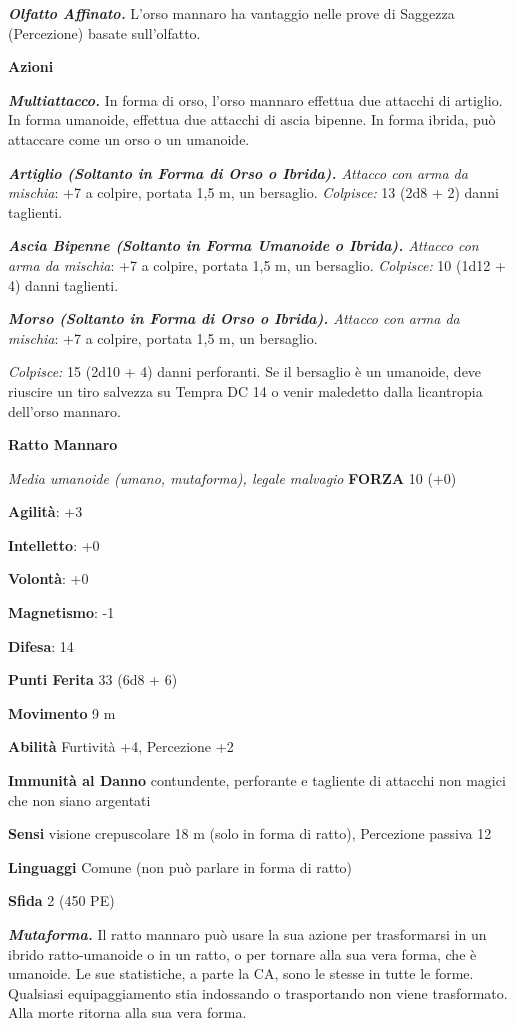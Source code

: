\begin{multicols}{2}
\emph{\textbf{Olfatto Affinato.}} L'orso mannaro ha vantaggio nelle
prove di Saggezza (Percezione) basate sull'olfatto.

\textbf{Azioni}

\emph{\textbf{Multiattacco.}} In forma di orso, l'orso mannaro effettua
due attacchi di artiglio. In forma umanoide, effettua due attacchi di
ascia bipenne. In forma ibrida, può attaccare come un orso o un
umanoide.

\emph{\textbf{Artiglio (Soltanto in Forma di Orso o Ibrida).} Attacco
con arma da mischia}: +7 a colpire, portata 1,5 m, un bersaglio.
\emph{Colpisce:} 13 (2d8 + 2) danni taglienti.

\emph{\textbf{Ascia Bipenne (Soltanto in Forma Umanoide o Ibrida).}
Attacco con arma da mischia}: +7 a colpire, portata 1,5 m, un bersaglio.
\emph{Colpisce:} 10 (1d12 + 4) danni taglienti.

\emph{\textbf{Morso (Soltanto in Forma di Orso o Ibrida).} Attacco con
arma da mischia}: +7 a colpire, portata 1,5 m, un bersaglio.

\emph{Colpisce:} 15 (2d10 + 4) danni perforanti. Se il bersaglio è un
umanoide, deve riuscire un tiro salvezza su Tempra DC 14 o venir
maledetto dalla licantropia dell'orso mannaro.

\textbf{Ratto Mannaro}

\emph{Media umanoide (umano, mutaforma), legale malvagio} \textbf{FORZA}
10 (+0)

\textbf{Agilità}: +3

\textbf{Intelletto}: +0

\textbf{Volontà}: +0

\textbf{Magnetismo}: -1

\textbf{Difesa}: 14

\textbf{Punti Ferita} 33 (6d8 + 6)

\textbf{Movimento} 9 m

\textbf{Abilità} Furtività +4, Percezione +2

\textbf{Immunità al Danno} contundente, perforante e tagliente di
attacchi non magici che non siano argentati

\textbf{Sensi} visione crepuscolare 18 m (solo in forma di ratto), Percezione
passiva 12

\textbf{Linguaggi} Comune (non può parlare in forma di ratto)

\textbf{Sfida} 2 (450 PE)

\emph{\textbf{Mutaforma.}} Il ratto mannaro può usare la sua azione per
trasformarsi in un ibrido ratto-umanoide o in un ratto, o per tornare
alla sua vera forma, che è umanoide. Le sue statistiche, a parte la CA,
sono le stesse in tutte le forme. Qualsiasi equipaggiamento stia
indossando o trasportando non viene trasformato. Alla morte ritorna alla
sua vera forma.


\end{multicols}
